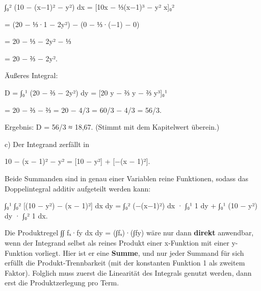 \documentclass[11pt, a4paper]{article}
\begin{document}
∫₀² (10 − (x−1)² − y²) dx = [10x − ⅓(x−1)³ − y² x]₀²

= (20 − ⅓·1 − 2y²) − (0 − ⅓·(−1) − 0)

= 20 − ⅓ − 2y² − ⅓

= 20 − ⅔ − 2y².


Äußeres Integral:

D = ∫₀¹ (20 − ⅔ − 2y²) dy = [20 y − ⅔ y − ⅔ y³]₀¹

= 20 − ⅔ − ⅔ = 20 − 4/3 = 60/3 − 4/3 = 56/3.


Ergebnis: D = 56/3 ≈ 18,67. (Stimmt mit dem Kapitelwert überein.)


c) Der Integrand zerfällt in

10 − (x − 1)² − y² = [10 − y²] + [−(x − 1)²].

Beide Summanden sind in genau einer Variablen reine Funktionen, sodass das Doppelintegral additiv aufgeteilt werden kann:

∫₀¹ ∫₀² [(10 − y²) − (x − 1)²] dx dy = ∫₀² (−(x−1)²) dx · ∫₀¹ 1 dy + ∫₀¹ (10 − y²) dy · ∫₀² 1 dx.


Die Produktregel ∫∫ fₓ·fy dx dy = (∫fₓ)·(∫fy) wäre nur dann \textbf{direkt} anwendbar, wenn der Integrand selbst als reines Produkt einer x-Funktion mit einer y-Funktion vorliegt. Hier ist er eine \textbf{Summe}, und nur jeder Summand für sich erfüllt die Produkt-Trennbarkeit (mit der konstanten Funktion 1 als zweitem Faktor). Folglich muss zuerst die Linearität des Integrals genutzt werden, dann erst die Produktzerlegung pro Term.





\end{document}
